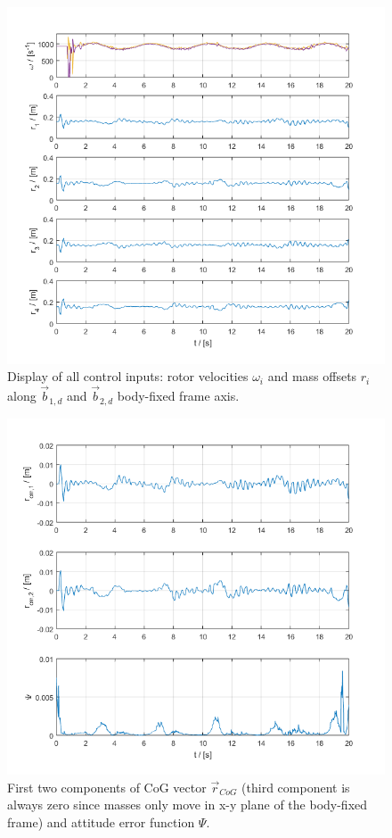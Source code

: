 \begin{figure}[h!]
	\centering
	\includegraphics[width=\columnwidth]{./pictures/mmc_traj_rotorVel_massOff.png}
	\caption{Display of all control inputs: rotor velocities $\omega_i$ and mass offsets $r_i$ along $\vec{b}_{1,d}$ and $\vec{b}_{2,d}$ body-fixed frame axis.}
	\label{fig:rotorVel_massOff}
\end{figure}

\begin{figure}[h!]
	\centering
	\includegraphics[width=\columnwidth]{./pictures/mmc_traj_rCm_attErr.png}
	\caption{First two components of CoG vector $\vec{r}_{CoG}$ (third component is always zero since masses only move in x-y plane of the body-fixed frame) and attitude error function $\Psi$. }
	\label{fig:rCm_attErr}
\end{figure}

